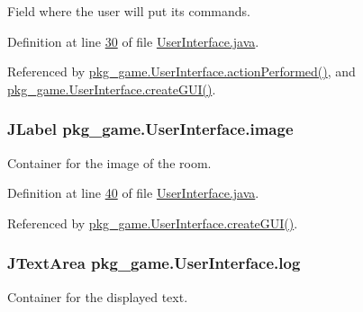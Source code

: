 Field where the user will put its commands. 



Definition at line \hyperlink{UserInterface_8java_source_l00030}{30} of file \hyperlink{UserInterface_8java_source}{User\-Interface.\-java}.



Referenced by \hyperlink{UserInterface_8java_source_l00214}{pkg\-\_\-game.\-User\-Interface.\-action\-Performed()}, and \hyperlink{UserInterface_8java_source_l00123}{pkg\-\_\-game.\-User\-Interface.\-create\-G\-U\-I()}.

\hypertarget{classpkg__game_1_1UserInterface_ac4146c151419321baacf6fb1769e7510}{
\subsubsection[{image}]{\setlength{\rightskip}{0pt plus 5cm}J\-Label pkg\-\_\-game.\-User\-Interface.\-image\hspace{0.3cm}{\ttfamily [private]}}}\label{classpkg__game_1_1UserInterface_ac4146c151419321baacf6fb1769e7510}


Container for the image of the room. 



Definition at line \hyperlink{UserInterface_8java_source_l00040}{40} of file \hyperlink{UserInterface_8java_source}{User\-Interface.\-java}.



Referenced by \hyperlink{UserInterface_8java_source_l00123}{pkg\-\_\-game.\-User\-Interface.\-create\-G\-U\-I()}.

\hypertarget{classpkg__game_1_1UserInterface_adc5e92cdd16b74971a7f6ff74d96bffb}{
\subsubsection[{log}]{\setlength{\rightskip}{0pt plus 5cm}J\-Text\-Area pkg\-\_\-game.\-User\-Interface.\-log\hspace{0.3cm}{\ttfamily [private]}}}\label{classpkg__game_1_1UserInterface_adc5e92cdd16b74971a7f6ff74d96bffb}


Container for the displayed text. 



